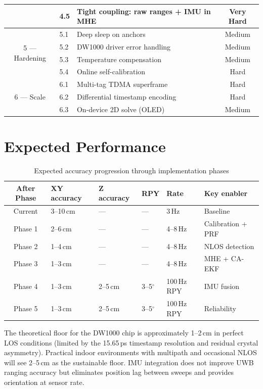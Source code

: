 \documentclass[11pt,a4paper]{article}
\begin{document}
\begin{table}[ht]
\begin{tabular}{cllc}
 & 4.5 & Tight coupling: raw ranges + IMU in MHE & Very Hard \\
\midrule
\multirow{4}{*}{5 --- Hardening}
 & 5.1 & Deep sleep on anchors & Medium \\
 & 5.2 & DW1000 driver error handling & Medium \\
 & 5.3 & Temperature compensation & Medium \\
 & 5.4 & Online self-calibration & Hard \\
\midrule
\multirow{3}{*}{6 --- Scale}
 & 6.1 & Multi-tag TDMA superframe & Hard \\
 & 6.2 & Differential timestamp encoding & Hard \\
 & 6.3 & On-device 2D solve (OLED) & Medium \\
\bottomrule
\end{tabular}
\end{table}

\section{Expected Performance}

\begin{table}[ht]
\centering
\caption{Expected accuracy progression through implementation phases}
\begin{tabular}{clllll}
\toprule
\textbf{After Phase} & \textbf{XY accuracy} & \textbf{Z accuracy} & \textbf{RPY} & \textbf{Rate} & \textbf{Key enabler} \\
\midrule
Current & 3--10\,cm & --- & --- & 3\,Hz & Baseline \\
Phase 1 & 2--6\,cm  & --- & --- & 4--8\,Hz & Calibration + PRF \\
Phase 2 & 1--4\,cm  & --- & --- & 4--8\,Hz & NLOS detection \\
Phase 3 & 1--3\,cm  & --- & --- & 4--8\,Hz & MHE + CA-EKF \\
Phase 4 & 1--3\,cm  & 2--5\,cm & 3--5$^\circ$ & 100\,Hz RPY & IMU fusion \\
Phase 5 & 1--3\,cm  & 2--5\,cm & 3--5$^\circ$ & 100\,Hz RPY & Reliability \\
\bottomrule
\end{tabular}
\end{table}

The theoretical floor for the DW1000 chip is approximately 1--2\,cm in perfect LOS conditions (limited by the 15.65\,ps timestamp resolution and residual crystal asymmetry). Practical indoor environments with multipath and occasional NLOS will see 2--5\,cm as the sustainable floor. IMU integration does not improve UWB ranging accuracy but eliminates position lag between sweeps and provides orientation at sensor rate.
\end{document}
